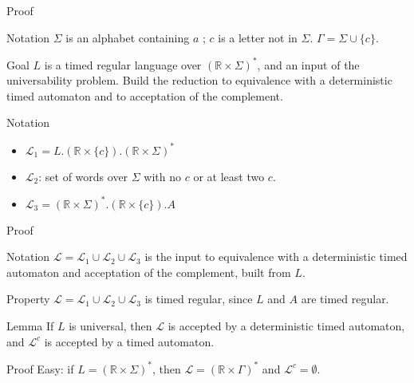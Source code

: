 \begin{frame}{Proof}

	\begin{block}{Notation}
	    $\Sigma$ is an alphabet containing $a$ ; $c$ is a letter not in $\Sigma$. $\Gamma = \Sigma \cup \{c\}$.
  	\end{block}

	\begin{block}{Goal}
		$L$ is a timed regular language over $(\mathbb{R}\times\Sigma)^*$, and an input of the universability problem. Build the reduction to equivalence with a deterministic timed automaton and to acceptation of the complement.\\
  	\end{block}

	\begin{block}{Notation}
		\begin{itemize}
			\item $\mathcal{L}_1 = L.(\mathbb{R} \times \{c\}).(\mathbb{R}\times\Sigma)^*$
			\item $\mathcal{L}_2$: set of words over $\Sigma$ with no $c$ or at least two $c$.
			\item $\mathcal{L}_3 = (\mathbb{R}\times\Sigma)^*.(\mathbb{R} \times \{c\}).A$
		\end{itemize}
  	\end{block}

\end{frame}


\begin{frame}{Proof}

	\begin{block}{Notation}
		$\mathcal{L} = \mathcal{L}_1 \cup \mathcal{L}_2 \cup \mathcal{L}_3$ is the input to equivalence with a deterministic timed automaton and acceptation of the complement, built from $L$.
	\end{block}

	\begin{block}{Property}
		$\mathcal{L} = \mathcal{L}_1 \cup \mathcal{L}_2 \cup \mathcal{L}_3$ is timed regular, since $L$ and $A$ are timed regular.
	\end{block}

	\begin{block}{Lemma}
		If $L$ is universal, then $\mathcal{L}$ is accepted by a deterministic timed automaton, and $\mathcal{L}^c$ is accepted by a timed automaton.
	\end{block}

	\begin{block}{Proof}
		Easy: if $L = (\mathbb{R}\times\Sigma)^*$, then $\mathcal{L} = (\mathbb{R}\times\Gamma)^*$ and $\mathcal{L}^c = \emptyset$.
	\end{block}

	
\end{frame}


